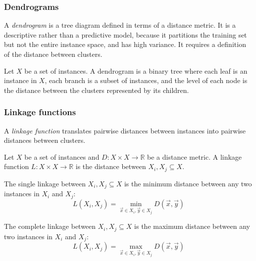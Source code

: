\subsubsection{Dendrograms}

A \textit{dendrogram} is a tree diagram defined in terms of a distance metric.
It is a descriptive rather than a predictive model, because it partitions the
training set but not the entire instance space, and has high variance.
It requires a definition of the distance between clusters.

\begin{dfn}
  [Dendrogram]
  Let $X$ be a set of instances.
  A dendrogram is a binary tree where each leaf is an instance in $X$, each
  branch is a subset of instances, and the level of each node is the distance
  between the clusters represented by its children.
\end{dfn}

\subsubsection{Linkage functions}

A \textit{linkage function} translates pairwise distances between instances into
pairwise distances between clusters.

\begin{dfn}
  Let $X$ be a set of instances and $D : X \times X \rightarrow \mathbb{R}$ be
  a distance metric.
  A linkage function $L : X \times X \rightarrow \mathbb{R}$ is the distance
  between $X_i, X_j \subseteq X$.
\end{dfn}

\begin{dfn}
  The single linkage between $X_i, X_j \subseteq X$ is the minimum distance
  between any two instances in $X_i$ and $X_j$:
  \begin{equation}
    L(X_i, X_j) =
    \min_{\vec{x} \in X_i, \vec{y} \in X_j} D(\vec{x}, \vec{y})
  \end{equation}
\end{dfn}

\begin{dfn}
  The complete linkage between $X_i, X_j \subseteq X$ is the maximum distance
  between any two instances in $X_i$ and $X_j$:
  \begin{equation}
    L(X_i, X_j) =
    \max_{\vec{x} \in X_i, \vec{y} \in X_j} D(\vec{x}, \vec{y})
  \end{equation}
\end{dfn}

